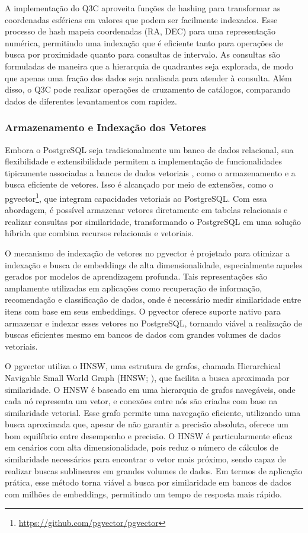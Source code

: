 A implementação do Q3C aproveita funções de hashing para transformar as coordenadas esféricas em valores que podem ser facilmente indexados. Esse processo de hash mapeia coordenadas (RA, DEC) para uma representação numérica, permitindo uma indexação que é eficiente tanto para operações de busca por proximidade quanto para consultas de intervalo. As consultas são formuladas de maneira que a hierarquia de quadrantes seja explorada, de modo que apenas uma fração dos dados seja analisada para atender à consulta. Além disso, o Q3C pode realizar operações de cruzamento de catálogos, comparando dados de diferentes levantamentos com rapidez.


\subsubsection{Armazenamento e Indexação dos Vetores}
\label{sec:si-vec-index}

Embora o PostgreSQL seja tradicionalmente um banco de dados relacional, sua flexibilidade e extensibilidade permitem a implementação de funcionalidades tipicamente associadas a bancos de dados vetoriais \citep{taipalus2024}, como o armazenamento e a busca eficiente de vetores. Isso é alcançado por meio de extensões, como o pgvector\footnote{\url{https://github.com/pgvector/pgvector}}, que integram capacidades vetoriais ao PostgreSQL. Com essa abordagem, é possível armazenar vetores diretamente em tabelas relacionais e realizar consultas por similaridade, transformando o PostgreSQL em uma solução híbrida que combina recursos relacionais e vetoriais.

O mecanismo de indexação de vetores no pgvector é projetado para otimizar a indexação e busca de embeddings de alta dimensionalidade, especialmente aqueles gerados por modelos de aprendizagem profunda. Tais representações são amplamente utilizadas em aplicações como recuperação de informação, recomendação e classificação de dados, onde é necessário medir similaridade entre itens com base em seus embeddings. O pgvector oferece suporte nativo para armazenar e indexar esses vetores no PostgreSQL, tornando viável a realização de buscas eficientes mesmo em bancos de dados com grandes volumes de dados vetoriais.

O pgvector utiliza o HNSW, uma estrutura de grafos, chamada Hierarchical Navigable Small World Graph (HNSW; \citealp{hnsw}), que facilita a busca aproximada por similaridade. O HNSW é baseado em uma hierarquia de grafos navegáveis, onde cada nó representa um vetor, e conexões entre nós são criadas com base na similaridade vetorial. Esse grafo permite uma navegação eficiente, utilizando uma busca aproximada que, apesar de não garantir a precisão absoluta, oferece um bom equilíbrio entre desempenho e precisão. O HNSW é particularmente eficaz em cenários com alta dimensionalidade, pois reduz o número de cálculos de similaridade necessários para encontrar o vetor mais próximo, sendo capaz de realizar buscas sublineares em grandes volumes de dados. Em termos de aplicação prática, esse método torna viável a busca por similaridade em bancos de dados com milhões de embeddings, permitindo um tempo de resposta mais rápido.



